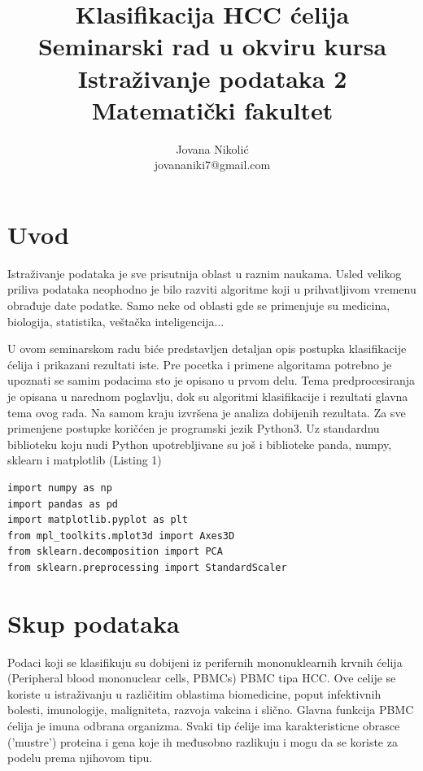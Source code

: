 \documentclass[14pt]{extarticle}
\begin{document}
\title{Klasifikacija HCC ćelija\\ \small{Seminarski rad u okviru kursa Istraživanje podataka 2} \\ \small {Matematički fakultet}}

\author{Jovana Nikolić\\ \small{jovananiki7@gmail.com}}


\maketitle

\hfill \break
\hfill \break
\hfill \break
\hfill \break
\hfill \break
\hfill \break
\hfill \break
\hfill \break
\hfill \break
\hfill \break
\hfill \break
\hfill \break
\hfill \break
\hfill \break
\hfill \break
\hfill \break
\hfill \break

\tableofcontents

\hfill \break


\section{Uvod}
\label{sec:uvod}
Istraživanje podataka je sve prisutnija oblast u raznim naukama. Usled velikog priliva podataka neophodno je bilo razviti algoritme koji u prihvatljivom vremenu obrađuje date podatke. Samo neke od oblasti gde se primenjuje su medicina, biologija, statistika, veštačka inteligencija...\cite{ip1}

U ovom seminarskom radu biće predstavljen detaljan opis postupka klasifikacije ćelija i prikazani rezultati iste. Pre pocetka i primene algoritama potrebno je upoznati se samim podacima sto je opisano u prvom delu. Tema predprocesiranja je opisana u narednom poglavlju, dok su algoritmi klasifikacije i rezultati glavna tema ovog rada. Na samom kraju izvršena je analiza dobijenih rezultata. Za sve primenjene postupke koričćen je programski jezik Python3. Uz standardnu biblioteku koju nudi Python upotrebljivane su još i biblioteke panda, numpy, sklearn i matplotlib (Listing 1)

\begin{lstlisting}[caption={Import biblioteka},frame=single, label=simple]
import numpy as np
import pandas as pd
import matplotlib.pyplot as plt
from mpl_toolkits.mplot3d import Axes3D
from sklearn.decomposition import PCA
from sklearn.preprocessing import StandardScaler
\end{lstlisting}


\section{Skup podataka} 
Podaci koji se klasifikuju su dobijeni iz perifernih mononuklearnih krvnih ćelija (Peripheral blood mononuclear cells, PBMCs) PBMC tipa HCC. Ove celije se koriste u istraživanju u različitim oblastima biomedicine, poput infektivnih bolesti, imunologije,
maligniteta, razvoja vakcina i slično. Glavna funkcija PBMC ćelija je imuna odbrana organizma. Svaki tip ćelije ima karakteristicne obrasce ('mustre') proteina i gena koje ih međusobno razlikuju i mogu da se koriste za podelu prema njihovom tipu. \cite{ip2}
\end{document}
